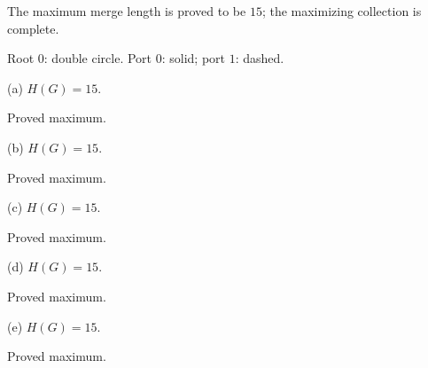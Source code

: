 \documentclass[10pt,a4paper]{article}
\begin{document}
{\small The maximum merge length is proved to be $15$; the maximizing collection is complete.}\par
\vspace{1mm}
{\small Root $0$: double circle. Port $0$: solid; port $1$: dashed.}\par
\vspace{3mm}
\noindent\hfill
\begin{minipage}[t]{.48\textwidth}\centering
\resizebox{5.7cm}{!}{}\par
{\footnotesize (a) $H(G)=15$.\par Proved maximum.}\par
\end{minipage}\hfill
\begin{minipage}[t]{.48\textwidth}\centering
\resizebox{5.7cm}{!}{}\par
{\footnotesize (b) $H(G)=15$.\par Proved maximum.}\par
\end{minipage}\hfill
\par\vspace{2.5mm}
\noindent\hfill
\begin{minipage}[t]{.48\textwidth}\centering
\resizebox{5.7cm}{!}{}\par
{\footnotesize (c) $H(G)=15$.\par Proved maximum.}\par
\end{minipage}\hfill
\begin{minipage}[t]{.48\textwidth}\centering
\resizebox{5.7cm}{!}{}\par
{\footnotesize (d) $H(G)=15$.\par Proved maximum.}\par
\end{minipage}\hfill
\par\vspace{2.5mm}
\noindent\hfill
\begin{minipage}[t]{.96\textwidth}\centering
\resizebox{5.7cm}{!}{}\par
{\footnotesize (e) $H(G)=15$.\par Proved maximum.}\par
\end{minipage}\hfill
\par\vspace{2.5mm}
\end{document}
